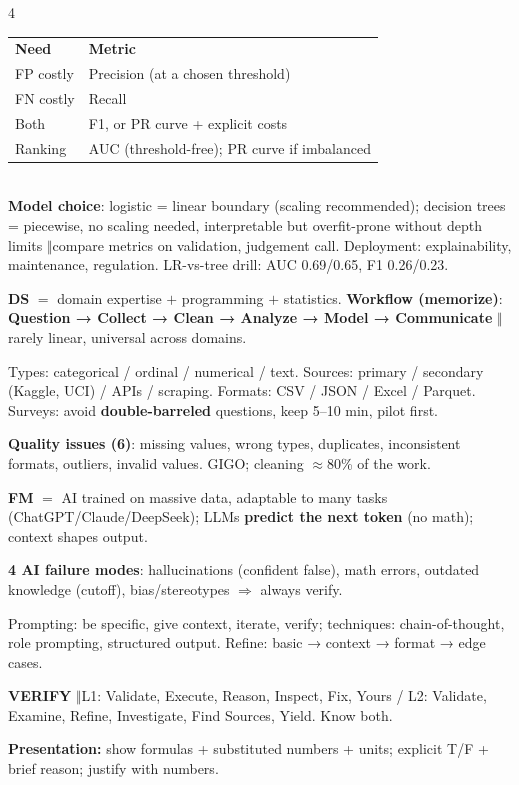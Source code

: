 \documentclass[a4paper,fontsize=8pt]{scrartcl}
\newenvironment{ul}{\begin{list}{\textbullet}{\setlength{\leftmargin}{1.05em}\setlength{\labelwidth}{0.6em}\setlength{\labelsep}{0.35em}\setlength{\itemsep}{0.45pt}\setlength{\parsep}{0pt}\setlength{\topsep}{0.65pt}\setlength{\partopsep}{0pt}}}{\end{list}}
\newcommand{\secB}[1]{\vspace{2.4pt}{\colorbox{hdrB}{\color{white}\bfseries\sffamily\scriptsize\ #1\ }}\par\vspace{1.4pt}}
\newcommand{\sep}{\ensuremath{\boldsymbol{\Vert}}}
\begin{document}
\begin{multicols*}{4}
\begin{ul}
\end{ul}
\footnotesize
\begin{tabular}{@{}p{1.05cm}p{4.85cm}@{}}
\textbf{Need} & \textbf{Metric}\\
FP costly & Precision (at a chosen threshold)\\
FN costly & Recall\\
Both & F1, or PR curve + explicit costs\\
Ranking & AUC (threshold-free); PR curve if imbalanced\\
\end{tabular}\normalsize\\
\textbf{Model choice}: logistic = linear boundary (scaling recommended); decision trees = piecewise, no scaling needed, interpretable but overfit-prone without depth limits \sep compare metrics on validation, judgement call. Deployment: explainability, maintenance, regulation. LR-vs-tree drill: AUC 0.69/0.65, F1 0.26/0.23.

\secB{L1 · DATA SCIENCE + AI BASICS}
\begin{ul}
\item \textbf{DS} $=$ domain expertise $+$ programming $+$ statistics. \textbf{Workflow (memorize)}: \textbf{Question → Collect → Clean → Analyze → Model → Communicate} \sep rarely linear, universal across domains.
\item Types: categorical / ordinal / numerical / text. Sources: primary / secondary (Kaggle, UCI) / APIs / scraping. Formats: CSV / JSON / Excel / Parquet. Surveys: avoid \textbf{double-barreled} questions, keep 5--10 min, pilot first.
\item \textbf{Quality issues (6)}: missing values, wrong types, duplicates, inconsistent formats, outliers, invalid values. GIGO; cleaning $\approx$80\% of the work.
\item \textbf{FM} $=$ AI trained on massive data, adaptable to many tasks (ChatGPT/Claude/DeepSeek); LLMs \textbf{predict the next token} (no math); context shapes output.
\item \textbf{4 AI failure modes}: hallucinations (confident false), math errors, outdated knowledge (cutoff), bias/stereotypes $\Rightarrow$ always verify.
\item Prompting: be specific, give context, iterate, verify; techniques: chain-of-thought, role prompting, structured output. Refine: basic → context → format → edge cases.
\item \textbf{VERIFY} \sep L1: Validate, Execute, Reason, Inspect, Fix, Yours / L2: Validate, Examine, Refine, Investigate, Find Sources, Yield. Know both.
\end{ul}

\textbf{Presentation:} show formulas + substituted numbers + units; explicit T/F + brief reason; justify with numbers.

\end{multicols*}
\end{document}
